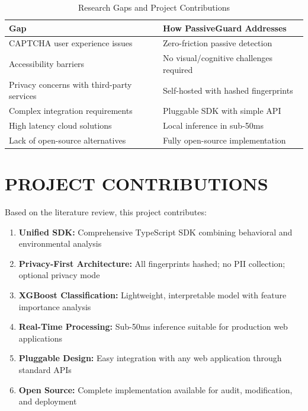 \begin{table}[H]
\centering
\caption{Research Gaps and Project Contributions}
\label{tab:gaps_summary}
\begin{tabular}{|p{5cm}|p{6cm}|}
\hline
\textbf{Gap} & \textbf{How PassiveGuard Addresses} \\
\hline
CAPTCHA user experience issues & Zero-friction passive detection \\
\hline
Accessibility barriers & No visual/cognitive challenges required \\
\hline
Privacy concerns with third-party services & Self-hosted with hashed fingerprints \\
\hline
Complex integration requirements & Pluggable SDK with simple API \\
\hline
High latency cloud solutions & Local inference in sub-50ms \\
\hline
Lack of open-source alternatives & Fully open-source implementation \\
\hline
\end{tabular}
\end{table}

\section{PROJECT CONTRIBUTIONS}

Based on the literature review, this project contributes:

\begin{enumerate}
    \item \textbf{Unified SDK:} Comprehensive TypeScript SDK combining behavioral and environmental analysis
    
    \item \textbf{Privacy-First Architecture:} All fingerprints hashed; no PII collection; optional privacy mode
    
    \item \textbf{XGBoost Classification:} Lightweight, interpretable model with feature importance analysis
    
    \item \textbf{Real-Time Processing:} Sub-50ms inference suitable for production web applications
    
    \item \textbf{Pluggable Design:} Easy integration with any web application through standard APIs
    
    \item \textbf{Open Source:} Complete implementation available for audit, modification, and deployment
\end{enumerate}

